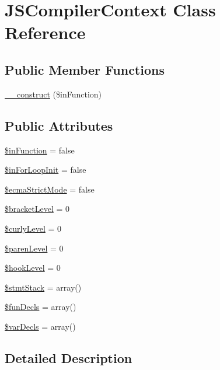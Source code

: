 \hypertarget{classJSCompilerContext}{\section{J\+S\+Compiler\+Context Class Reference}
\label{classJSCompilerContext}
}
\subsection*{Public Member Functions}
\begin{DoxyCompactItemize}
\item 
\hyperlink{classJSCompilerContext_a81de9315cc7ef08f0787e497ce7c5cbc}{\+\_\+\+\_\+construct} (\$in\+Function)
\end{DoxyCompactItemize}
\subsection*{Public Attributes}
\begin{DoxyCompactItemize}
\item 
\hyperlink{classJSCompilerContext_a6f44ab48553406ef9341d80357cc95e2}{\$in\+Function} = false
\item 
\hyperlink{classJSCompilerContext_acd4955dc8f8a30c87fd5457f946dc270}{\$in\+For\+Loop\+Init} = false
\item 
\hyperlink{classJSCompilerContext_aa3f054dfbdebeefaa80fed265846d4bb}{\$ecma\+Strict\+Mode} = false
\item 
\hyperlink{classJSCompilerContext_acaa96aafaaf8be0f2afa814e13b9e283}{\$bracket\+Level} = 0
\item 
\hyperlink{classJSCompilerContext_aa62aefa51b42ca000d5b2972a17c0c75}{\$curly\+Level} = 0
\item 
\hyperlink{classJSCompilerContext_a6a20d7b7a0ac24161ff9b414f8275223}{\$paren\+Level} = 0
\item 
\hyperlink{classJSCompilerContext_a54d411f75337b5e12ff88dc15ab8874d}{\$hook\+Level} = 0
\item 
\hyperlink{classJSCompilerContext_a2043060677a2964f657d377dad923ae7}{\$stmt\+Stack} = array()
\item 
\hyperlink{classJSCompilerContext_a79d313ac507c757ff7ed6f3a6cd86fb7}{\$fun\+Decls} = array()
\item 
\hyperlink{classJSCompilerContext_a7d936469daab40aea907fbe246e1a1d9}{\$var\+Decls} = array()
\end{DoxyCompactItemize}


\subsection{Detailed Description}


